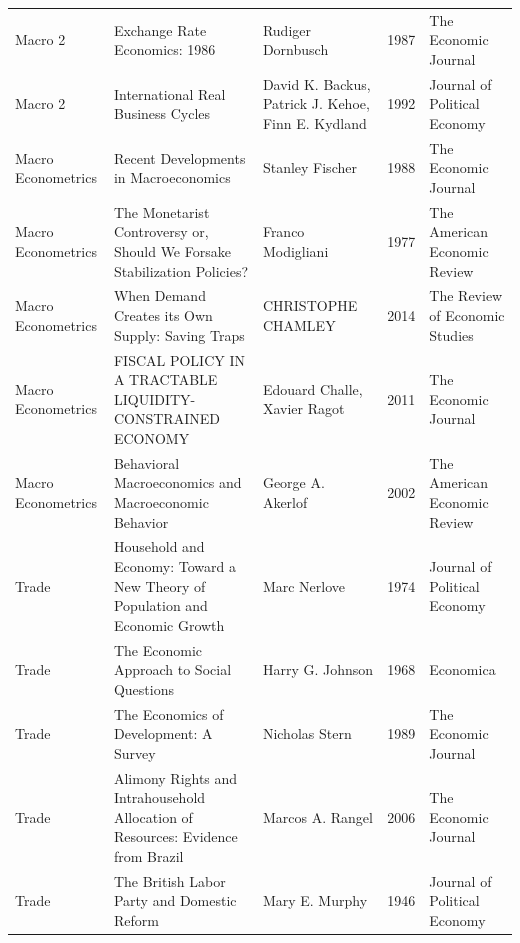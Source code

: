 \begin{xltabular}[p]{\hsize}{sYsrs}
Macro 2 & Exchange Rate Economics: 1986 & Rudiger Dornbusch & 1987 & The Economic Journal \\
Macro 2 & International Real Business Cycles & David K. Backus, Patrick J. Kehoe, Finn E. Kydland & 1992 & Journal of Political Economy \\
Macro Econometrics & Recent Developments in Macroeconomics & Stanley Fischer & 1988 & The Economic Journal \\
Macro Econometrics & The Monetarist Controversy or, Should We Forsake Stabilization Policies? & Franco Modigliani & 1977 & The American Economic Review \\
Macro Econometrics & When Demand Creates its Own Supply: Saving Traps & CHRISTOPHE CHAMLEY & 2014 & The Review of Economic Studies \\
Macro Econometrics & FISCAL POLICY IN A TRACTABLE LIQUIDITY-CONSTRAINED ECONOMY & Edouard Challe, Xavier Ragot & 2011 & The Economic Journal \\
Macro Econometrics & Behavioral Macroeconomics and Macroeconomic Behavior & George A. Akerlof & 2002 & The American Economic Review \\
Trade & Household and Economy: Toward a New Theory of Population and Economic Growth & Marc Nerlove & 1974 & Journal of Political Economy \\
Trade & The Economic Approach to Social Questions & Harry G. Johnson & 1968 & Economica \\
Trade & The Economics of Development: A Survey & Nicholas Stern & 1989 & The Economic Journal \\
Trade & Alimony Rights and Intrahousehold Allocation of Resources: Evidence from Brazil & Marcos A. Rangel & 2006 & The Economic Journal \\
Trade & The British Labor Party and Domestic Reform & Mary E. Murphy & 1946 & Journal of Political Economy \\


\end{xltabular}
